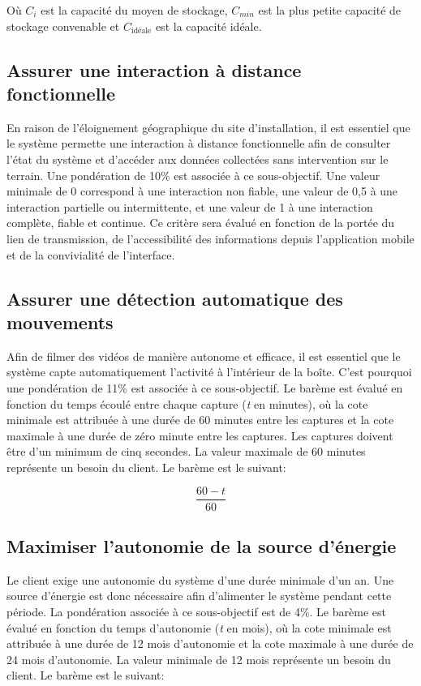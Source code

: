 \noindent
Où $C_i$ est la capacité du moyen de stockage, $C_{min}$ est la plus petite capacité de stockage convenable et $C_{\text{idéale}}$ est la capacité idéale.

\subsection{Assurer une interaction à distance fonctionnelle}

En raison de l’éloignement géographique du site d’installation, il est
essentiel que le système permette une interaction à distance fonctionnelle afin
de consulter l’état du système et d’accéder aux données collectées sans
intervention sur le terrain. Une pondération de 10\% est associée à ce
sous-objectif. Une valeur minimale de 0 correspond à une interaction non
fiable, une valeur de 0,5 à une interaction partielle ou intermittente, et une
valeur de 1 à une interaction complète, fiable et continue. Ce critère sera
évalué en fonction de la portée du lien de transmission, de l’accessibilité
des informations depuis l'application mobile et de la convivialité de l'interface.

\subsection{Assurer une détection automatique des mouvements}

Afin de filmer des vidéos de manière autonome et efficace, il est essentiel que
le système capte automatiquement l’activité à l’intérieur de la boîte. C’est
pourquoi une pondération de 11\% est associée à ce sous-objectif. Le barème est
évalué en fonction du temps écoulé entre chaque capture (\textit{t} en
minutes), où la cote minimale est attribuée à une durée de 60 minutes entre les
captures et la cote maximale à une durée de zéro minute entre les captures. Les
captures doivent être d’un minimum de cinq secondes. La valeur maximale de 60
minutes représente un besoin du client. Le barème est le suivant:

\begin{equation}
  \frac{60 - t}{60}
\end{equation}

\subsection{Maximiser l'autonomie de la source d'énergie}

Le client exige une autonomie du système d’une durée minimale d’un an. Une
source d’énergie est donc nécessaire afin d’alimenter le système pendant cette
période. La pondération associée à ce sous-objectif est de 4\%. Le barème est
évalué en fonction du temps d’autonomie (\textit{t} en mois), où la cote
minimale est attribuée à une durée de 12 mois d’autonomie et la cote maximale à
une durée de 24 mois d’autonomie. La valeur minimale de 12 mois représente un
besoin du client. Le barème est le suivant:

